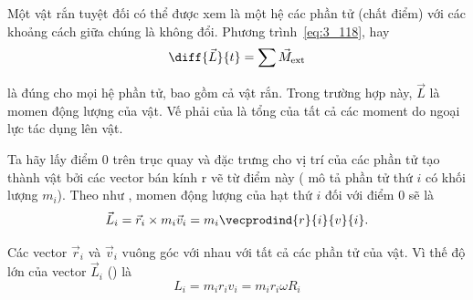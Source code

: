 Một vật rắn tuyệt đối có thể được xem là một hệ các phần tử (chất điểm) với các khoảng cách giữa chúng là không đổi. Phương trình~\eqref{eq:3_118}, hay
\begin{equation*}
\diff{\vec{L}}{t} = \sum \vec{M}_{\text{ext}}
\end{equation*}

\noindent
là đúng cho mọi hệ phần tử, bao gồm cả vật rắn. Trong trường hợp này, $\vec{L}$ là momen động lượng của vật. Vế phải của  là tổng của tất cả các moment do ngoại lực tác dụng lên vật.

Ta hãy lấy điểm $0$ trên trục quay và đặc trưng cho vị trí của các phần tử tạo thành vật bởi các vector bán kính r vẽ từ điểm này ( mô tả phần tử thứ $i$ có khối lượng $m_i$). Theo như , momen động lượng của hạt thứ $i$ đối với điểm $0$ sẽ là
\begin{equation}\label{eq:5_7}
\vec{L}_i = \vec{r}_i \times m_i\vec{v}_i = m_i\vecprodind{r}{i}{v}{i}.
\end{equation}

\noindent
Các vector $\vec{r}_i$ và $\vec{v}_i$ vuông góc với nhau với tất cả các phần tử của vật. Vì thế độ lớn của vector $\vec{L}_i$ () là
\begin{equation}\label{eq:5_8}
L_i = m_i r_i v_i = m_i r_i \omega R_i
\end{equation}

